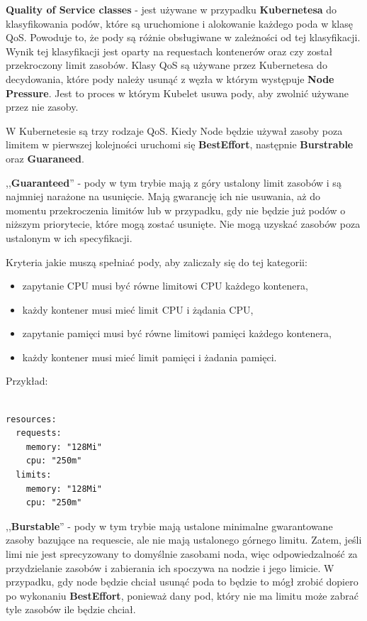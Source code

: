 \documentclass{iiuwb}
\begin{document}
\textbf{Quality of Service classes} - jest używane w przypadku 
\textbf{Kubernetesa} do klasyfikowania podów, które są uruchomione 
i alokowanie każdego poda w klasę QoS. Powoduje to, że pody są
różnie obsługiwane w zależności od tej klasyfikacji. Wynik tej 
klasyfikacji jest oparty na requestach kontenerów oraz czy został 
przekroczony limit zasobów. Klasy QoS są używane przez Kubernetesa 
do decydowania, które pody należy usunąć z węzła w którym występuje 
\textbf{Node Pressure}. Jest to proces w którym Kubelet usuwa 
pody, aby zwolnić używane przez nie zasoby.

W Kubernetesie są trzy rodzaje QoS. Kiedy Node będzie używał zasoby poza limitem w pierwszej 
kolejności uruchomi się \textbf{BestEffort}, następnie 
\textbf{Burstrable} oraz \textbf{Guaraneed}.

,,\textbf{Guaranteed}'' - pody w tym trybie mają z góry ustalony 
limit zasobów i są najmniej narażone na usunięcie. Mają 
gwarancję ich nie usuwania, aż do momentu przekroczenia 
limitów lub w przypadku, gdy nie będzie już podów o niższym 
priorytecie, które mogą zostać usunięte. Nie mogą uzyskać 
zasobów poza ustalonym w ich specyfikacji.

Kryteria jakie muszą spełniać pody, aby zaliczały się do tej 
kategorii:

\begin{itemize}
 \item zapytanie CPU musi być równe limitowi CPU każdego kontenera,
 \item każdy kontener musi mieć limit CPU i żądania CPU,
 \item zapytanie pamięci musi być równe limitowi pamięci każdego kontenera,
 \item każdy kontener musi mieć limit pamięci i żadania pamięci. 
\end{itemize}

Przykład:

\begin{lstlisting}[breaklines=true]

resources:
  requests:
    memory: "128Mi"
    cpu: "250m"
  limits:
    memory: "128Mi"
    cpu: "250m"

\end{lstlisting}


,,\textbf{Burstable}'' - pody w tym trybie mają ustalone 
minimalne gwarantowane zasoby bazujące na requescie, ale 
nie mają ustalonego górnego limitu. Zatem, jeśli limi nie jest 
sprecyzowany to domyślnie zasobami noda, więc odpowiedzalność 
za przydzielanie zasobów i zabierania ich spoczywa na nodzie i 
jego limicie. W przypadku, gdy node będzie chciał usunąć poda 
to będzie to mógł zrobić dopiero po wykonaniu \textbf{BestEffort}, 
ponieważ dany pod, który nie ma limitu może zabrać tyle zasobów 
ile będzie chciał.
\end{document}
